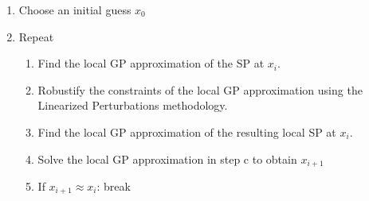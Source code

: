 \begin{enumerate}
    \item Choose an initial guess $x_0$
    \item Repeat
    \begin{enumerate}
        \item Find the local GP approximation of the SP at $x_i$.
        \item Robustify the constraints of the local GP approximation using the Linearized Perturbations methodology.
        \item Find the local GP approximation of the resulting local SP at $x_i$.
        \item Solve the local GP approximation in step c to obtain $x_{i+1}$
        \item If $x_{i+1} \approx x_{i}$: break
    \end{enumerate}
\end{enumerate}
